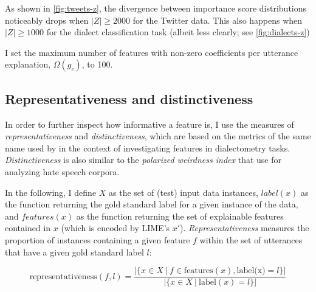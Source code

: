 



As shown in \autoref{fig:tweets-z}, the divergence between importance score distributions noticeably drops when $|Z| \geq 2000$ for the Twitter data.
This also happens when $|Z| \geq 1000$ for the dialect classification task
(albeit less clearly; see \autoref{fig:dialects-z})


I set the maximum number of features with non-zero coefficients per utterance explanation, $\Omega(g_c)$, to 100.


\subsection{Representativeness and distinctiveness}
\label{sec:rep-dist}

In order to further inspect how informative a feature is, I use the measures of \textit{representativeness} and \textit{distinctiveness}, which are based on the metrics of the same name used by \citet{wieling2011bipartite} in the context of investigating features in dialectometry tasks.
\textit{Distinctiveness} is also similar to the \textit{polarized weirdness index} that \citet{poletto2020resources} use for analyzing hate speech corpora.

In the following, I define $X$ as the set of (test) input data instances, $label(x)$ as the function returning the gold standard label for a given instance of the data, and $features(x)$ as the function returning the set of explainable features contained in $x$ (which is encoded by LIME's $x'$).
\textit{Representativeness} measures the proportion of instances containing a given feature $f$ within the set of utterances that have a given gold standard label $l$:

\begin{equation}
    \text{representativeness}(f, l) = \frac{|\{x \in X~\vert~f \in \text{features}(x), \text{label(x)} = l\}|}{|\{x \in X~\vert~\text{label}(x) = l\}|}
\end{equation}

